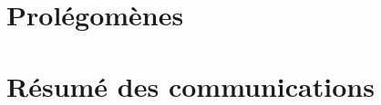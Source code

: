 \documentclass[12pt,a4paper, openright]{book}
\begin{document}
\SetBgContents{}
\pagestyle{fancyplain}
\dominitoc


\frontmatter
%

%
\part{Prolégomènes}

 
 \cleardoublepage
 
 \cleardoublepage
 
 \cleardoublepage
 
 \cleardoublepage
 
 \cleardoublepage
 


{}
\tableofcontents
%
\mainmatter

\adjustmtc[+1]

\part{Résumé des communications}
%
\makeatletter
\renewcommand{\@chapapp}{Thème}
\makeatother
\end{document}
